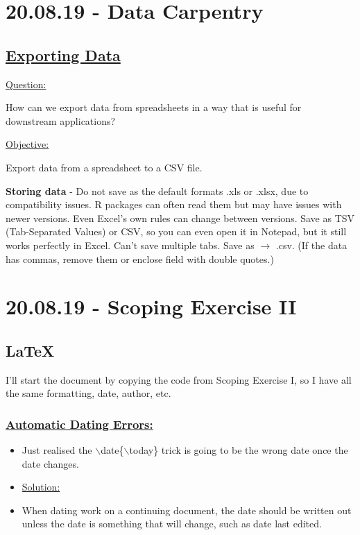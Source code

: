 \documentclass[12pt]{article}
\begin{document}
\color{black}
\vspace{1em}
\section{20.08.19 - Data Carpentry}

\subsection{\href{https://datacarpentry.org/spreadsheets-socialsci/05-exporting-data/index.html}{\textbf{Exporting Data}}}

\color{gray}
\underline{Question:}

How can we export data from spreadsheets in a way that is useful for downstream applications?

\underline{Objective:}

Export data from a spreadsheet to a CSV file.

\color{black}

\textbf{Storing data} - Do not save as the default formats .xls or .xlsx, due to compatibility issues. R packages can often read them but may have issues with newer versions. Even Excel's own rules can change between versions. Save as TSV (Tab-Separated Values) or CSV, so you can even open it in Notepad, but it still works perfectly in Excel. Can't save multiple tabs. Save as $\rightarrow$ .csv. (If the data has commas, remove them or enclose field with double quotes.)

\newpage\section{20.08.19 - Scoping Exercise II}

\subsection{LaTeX}
\vspace{1em}
I'll start the document by copying the code from Scoping Exercise I, so I have all the same formatting, date, author, etc.

\subsubsection{\underline{Automatic Dating Errors:}}\label{error:er10}
\begin{itemize}
    \item Just realised the $\backslash$date\{$\backslash$today\} trick is going to be the wrong date once the date changes.
\end{itemize}
\begin{itemize}
\renewcommand{\labelitemi}{$\nobullet$}
\item \underline{Solution:}
\renewcommand{\labelitemi}{$\bullet$}
    \item When dating work on a continuing document, the date should be written out unless the date is something that will change, such as date last edited.
\end{itemize}
\end{document}
